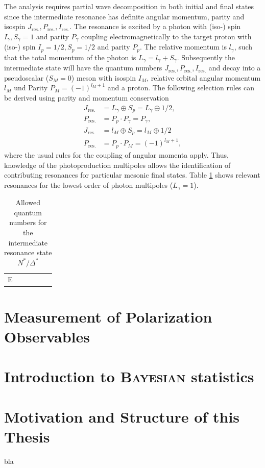 The analysis requires partial wave decomposition in both initial and final states \cite{Drechsel} since the intermediate resonance has definite angular momentum, parity  and isospin $J_\text{res.}, P_\text{res.}, I_\text{res.}$. The resonance is excited by a photon with (iso-) spin $I_\gamma,S_\gamma =1$ and parity $P_\gamma$ coupling electromagnetically to the target proton with (iso-) spin $I_p=1/2,S_p=1/2$ and parity $P_p$. The relative momentum is $l_\gamma$, such that the total momentum of the photon is $L_\gamma=l_\gamma+S_\gamma$. Subsequently the intermediate state will have the quantum numbers $J_\text{res.}, P_\text{res.}, I_\text{res.}$ and decay into a pseudoscalar ($S_M=0$) meson with isospin $I_M$, relative orbital angular momentum $l_M$ und Parity $P_M=(-1)^{l_M+1}$ and a proton. The following selection rules can be derived using parity and momentum conservation \cite{Krusche,farahphd}
\begin{align}
	J_\text{res.}&=L_\gamma\oplus S_p = L_\gamma\oplus 1/2,\\
	P_\text{res.}&=P_p\cdot P_\gamma=P_\gamma,\\
	J_\text{res.}&=l_M\oplus S_p = l_M\oplus 1/2\\
	P_\text{res.}&=P_p\cdot P_M=(-1)^{l_M+1},
\end{align}
where the usual rules for the coupling of angular momenta \cite{theo3} apply. Thus, knowledge of the photoproduction multipoles allows the identification of contributing resonances for particular mesonic final states. Table \ref{tab:qn} shows relevant resonances for the lowest order of photon multipoles ($L_\gamma=1$).

\begin{table}[htbp]
	\begin{tabular}{cccccc}
		\toprule
		E
	\end{tabular}
\caption{Allowed quantum numbers for the intermediate resonance state $N^*/\Delta^*$}
\label{tab:qn}
\end{table}

\section{Measurement of Polarization Observables}

\section{Introduction to \textsc{Bayesian} statistics}
\subsection{}

\section{Motivation and Structure of this Thesis}
bla
